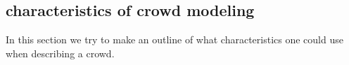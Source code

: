 \subsection{characteristics of crowd modeling}
In this section we try to make an outline of what characteristics one could use when
describing a crowd.

%

